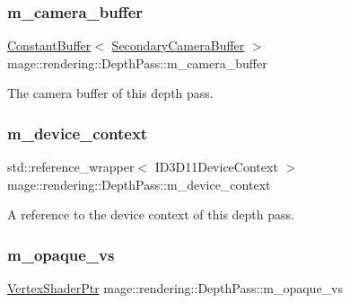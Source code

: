 \subsubsection{\texorpdfstring{m\+\_\+camera\+\_\+buffer}{m\_camera\_buffer}}
{\footnotesize\ttfamily \hyperlink{classmage_1_1rendering_1_1_constant_buffer}{Constant\+Buffer}$<$ \hyperlink{structmage_1_1rendering_1_1_secondary_camera_buffer}{Secondary\+Camera\+Buffer} $>$ mage\+::rendering\+::\+Depth\+Pass\+::m\+\_\+camera\+\_\+buffer\hspace{0.3cm}{\ttfamily [private]}}

The camera buffer of this depth pass. \hypertarget{classmage_1_1rendering_1_1_depth_pass_a304b434841fb8a8b443df0e790630023}{}\label{classmage_1_1rendering_1_1_depth_pass_a304b434841fb8a8b443df0e790630023} 
\subsubsection{\texorpdfstring{m\+\_\+device\+\_\+context}{m\_device\_context}}
{\footnotesize\ttfamily std\+::reference\+\_\+wrapper$<$ I\+D3\+D11\+Device\+Context $>$ mage\+::rendering\+::\+Depth\+Pass\+::m\+\_\+device\+\_\+context\hspace{0.3cm}{\ttfamily [private]}}

A reference to the device context of this depth pass. \hypertarget{classmage_1_1rendering_1_1_depth_pass_a101f60b0363f79f9d349ea95e0efabe5}{}\label{classmage_1_1rendering_1_1_depth_pass_a101f60b0363f79f9d349ea95e0efabe5} 
\subsubsection{\texorpdfstring{m\+\_\+opaque\+\_\+vs}{m\_opaque\_vs}}
{\footnotesize\ttfamily \hyperlink{namespacemage_1_1rendering_aaf704b9c54a4181f4950a1761de69dda}{Vertex\+Shader\+Ptr} mage\+::rendering\+::\+Depth\+Pass\+::m\+\_\+opaque\+\_\+vs\hspace{0.3cm}{\ttfamily [private]}}

